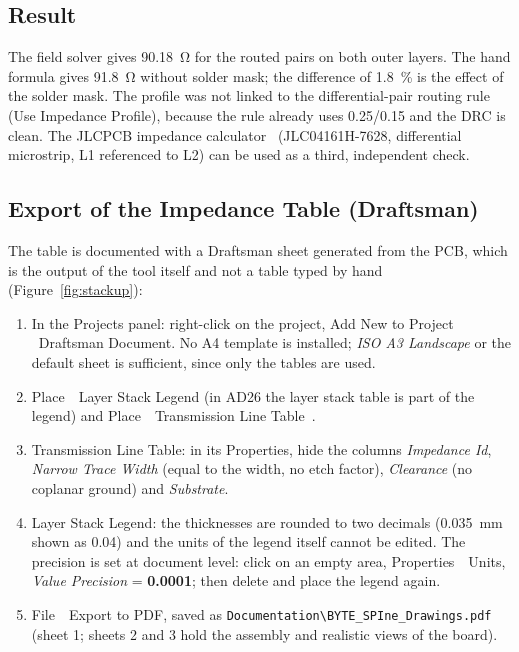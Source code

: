 \documentclass[11pt,a4paper]{article}
\newcommand{\gui}[1]{\textsf{#1}}
\newcommand{\m}{\,\guillemotright\ }
\begin{document}
\subsection{Result}

The field solver gives \qty{90.18}{\ohm} for the routed pairs on both outer layers. The hand formula gives
\qty{91.8}{\ohm} without solder mask; the difference of \qty{1.8}{\percent} is the effect of the solder mask. The profile was
not linked to the differential-pair routing rule (\gui{Use Impedance Profile}), because the rule already
uses 0.25/0.15 and the DRC is clean. The JLCPCB impedance calculator~\cite{jlcimp} (JLC04161H-7628,
differential microstrip, L1 referenced to L2) can be used as a third, independent check.

\subsection{Export of the Impedance Table (Draftsman)}

The table is documented with a Draftsman sheet generated from the PCB, which is the output
of the tool itself and not a table typed by hand (Figure~\ref{fig:stackup}):
\begin{enumerate}
    \item In the \gui{Projects} panel: right-click on the project, \gui{Add New to Project \m Draftsman Document}.
    No A4 template is installed; \textit{ISO A3 Landscape} or the default sheet is sufficient, since only
    the tables are used.
    \item \gui{Place \m Layer Stack Legend} (in AD26 the layer stack table is part of the legend) and \gui{Place
    \m Transmission Line Table}~\cite{altiumtlt}.
    \item Transmission Line Table: in its Properties, hide the columns \textit{Impedance Id}, \textit{Narrow Trace
    Width} (equal to the width, no etch factor), \textit{Clearance} (no coplanar ground) and \textit{Substrate}.
    \item Layer Stack Legend: the thicknesses are rounded to two decimals (\qty{0.035}{mm} shown as 0.04)
    and the units of the legend itself cannot be edited. The precision is set at document level:
    click on an empty area, \gui{Properties \m Units}, \textit{Value Precision} = \textbf{0.0001}; then delete and
    place the legend again.
    \item \gui{File \m Export to PDF}, saved as \texttt{Documentation\textbackslash BYTE\_SPIne\_Drawings.pdf}
    (sheet 1; sheets 2 and 3 hold the assembly and realistic views of the board).
\end{enumerate}
\end{document}

